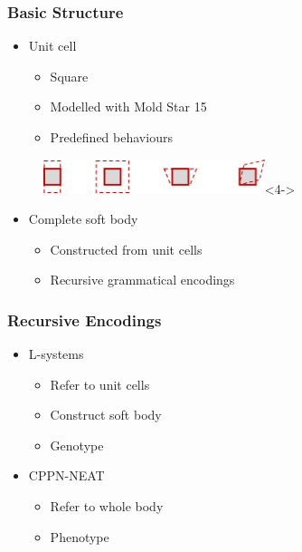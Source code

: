 \documentclass[serif, pdf]{beamer}
\begin{document}

\begin{frame}
    \frametitle{Basic Structure}
    \begin{itemize}
        \item<1-> Unit cell
        \changefontsizes{11pt}
        \begin{itemize}
            \item<2-> Square
            \item<3-> Modelled with Mold Star 15
            \item<4-> Predefined behaviours
        \end{itemize}
    \end{itemize}
    \begin{figure}
        \centering
        \includegraphics[height = 1cm]{Unit_Cell_Deformation.jpg}<4->
    \end{figure}
    \begin{itemize}
        \item<5-> Complete soft body
        \changefontsizes{11pt}
        \begin{itemize}
            \item<5-> Constructed from unit cells
            \item<6-> Recursive grammatical encodings
        \end{itemize}
    \end{itemize}
\end{frame}


\begin{frame}
    \frametitle{Recursive Encodings}
    \begin{itemize}
        \item<1-> L-systems
        \changefontsizes{11pt}
        \begin{itemize}
            \item<2-> Refer to unit cells
            \item<3-> Construct soft body
            \item<4-> Genotype
        \end{itemize}
        \item<5-> CPPN-NEAT
        \changefontsizes{11pt}
        \begin{itemize}
            \item<6-> Refer to whole body
            \item<7-> Phenotype
        \end{itemize}
    \end{itemize}
\end{frame}
\end{document}
